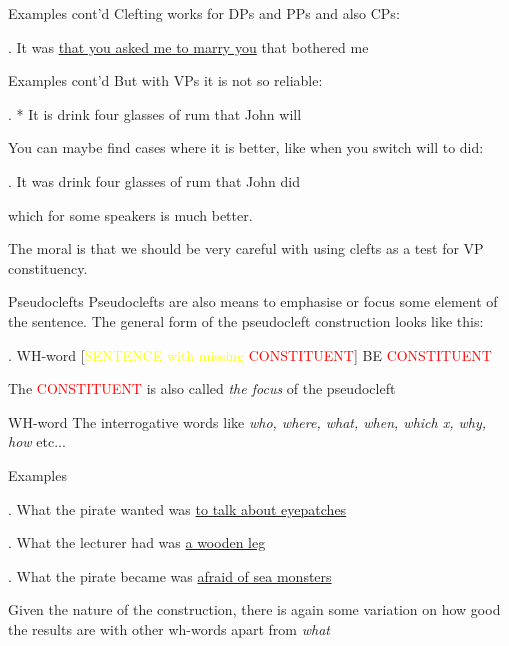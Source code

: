 \begin{frame}
  {Examples cont'd}
Clefting works for DPs and PPs and also CPs:

\ex.
It was \underline{that you asked me to marry you} that\newline {} bothered me


\end{frame}

\begin{frame}
   {Examples cont'd}
But with VPs it is not so reliable:

\ex.
* It is drink four glasses of rum that John will 

You can maybe find cases where it is better, like when you switch will to did:

\ex.
 It was drink four glasses of rum that John did

which for some speakers is much better. 
\pause

The moral is that we should be very careful with using clefts as a test for VP constituency.



\end{frame}

\begin{frame}
  {Pseudoclefts}
Pseudoclefts are also means to emphasise or focus some element of the sentence.  The general form of the pseudocleft construction looks like this:

\ex.
   WH-word [\textcolor{yellow}{SENTENCE with missing} \textcolor{red}{CONSTITUENT}] BE \textcolor{red}{CONSTITUENT}

The \textcolor{red}{CONSTITUENT} is also called \textit{the focus} of the pseudocleft

   \begin{block}
     {WH-word}
The interrogative words like \textit{who, where, what, when, which x, why, how} etc...
   \end{block}
\end{frame}


\begin{frame}
  {Examples}

\ex.
What the pirate wanted was \underline{to talk about eyepatches}

\ex.
What the lecturer had was \underline{a wooden leg}

\ex.
What the pirate became was \underline{afraid of sea monsters}



Given the nature of the construction, there is again some variation on how good the results are with other wh-words apart from \textit{what}

\end{frame}




